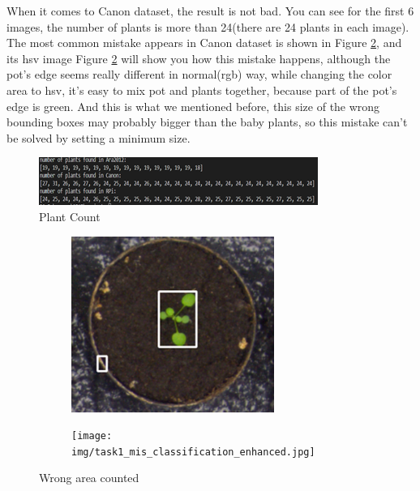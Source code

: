 \documentclass[conference]{IEEEtran}
\begin{document}
When it comes to Canon dataset, the result is not bad. You can see for the first 6 images, the number of plants is more than 24(there are 24 plants in each image). The most common mistake appears in Canon dataset is shown in Figure \ref{fig:task1_eg_mis_class}, and its hsv image Figure \ref{fig:task1_eg_mis_class} will show you how this mistake happens, although the pot’s edge seems really different in normal(rgb) way, while changing the color area to hsv, it’s easy to mix pot and plants together, because part of 
the pot’s edge is green. And this is what we mentioned before, this size of the wrong bounding boxes may probably  bigger than the baby plants, so this mistake can’t be solved by setting a minimum size.

\begin{figure}[h!]
\centering
\includegraphics[width=0.9\linewidth]{img/task1_plant_count.png}
\caption{Plant Count}
\label{task1_plant_count}
\end{figure}
\begin{figure}[h!]
\centering
\begin{subfigure}[h!]{0.24\textwidth}
    \centering
    \includegraphics[width=\textwidth]{img/task1_mis_classification.png}
\end{subfigure}
\hfill
\begin{subfigure}[h!]{0.24\textwidth}
    \centering
    \texttt{[image: img/task1\_mis\_classification\_enhanced.jpg]}
\end{subfigure}
\caption{Wrong area counted}
\label{fig:task1_eg_mis_class}
\end{figure}
\end{document}
